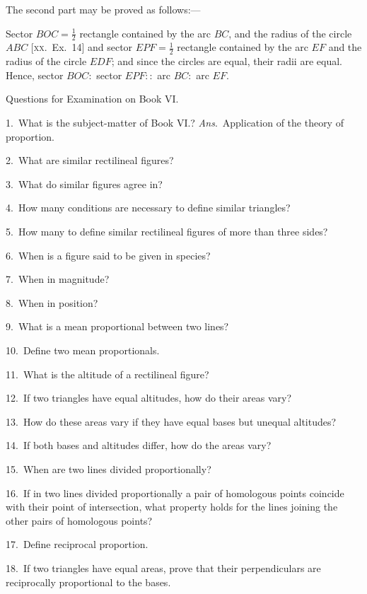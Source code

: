 \documentclass[oneside]{book}
\newcommand\exhead[1]{
\Needspace*{5\baselineskip}\begin{center}
\textsf{#1}
\end{center}
}
\begin{document}
\smallskip
The second part may be proved as follows:---

\begin{footnotesize}
Sector $BOC = \tfrac{1}{2}$ rectangle contained by the arc $BC$, and the
radius of the circle $ABC$ [\textsc{xx.}\ Ex.~14] and sector $EPF = \tfrac{1}{2}$ rectangle
contained by the arc $EF$ and the radius of the circle $EDF$;
and since the circles are equal, their radii are equal. Hence,
sector $BOC :$ sector $EPF ::$ arc $BC :$ arc $EF$.
\par\end{footnotesize}

\exhead{Questions for Examination on Book VI\@.}

\begin{footnotesize}
1.~What is the subject-matter of Book VI\@.? \textit{Ans}.\ Application
of the theory of proportion.

2.~What are similar rectilineal figures?

3.~What do similar figures agree in?

4.~How many conditions are necessary to define similar triangles?

5.~How many to define similar rectilineal figures of more
than three sides?

6.~When is a figure said to be given in species?

7.~When in magnitude?

8.~When in position?

9.~What is a mean proportional between two lines?

10.~Define two mean proportionals.

11.~What is the altitude of a rectilineal figure?

12.~If two triangles have equal altitudes, how do their areas
vary?

13.~How do these areas vary if they have equal bases but unequal altitudes?

14.~If both bases and altitudes differ, how do the areas vary?

15.~When are two lines divided proportionally?

16.~If in two lines divided proportionally a pair of homologous
points coincide with their point of intersection, what property
holds for the lines joining the other pairs of homologous
points?

17.~Define reciprocal proportion.

18.~If two triangles have equal areas, prove that their perpendiculars
are reciprocally proportional to the bases.


\end{footnotesize}
\end{document}
